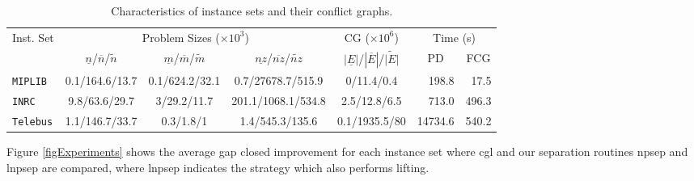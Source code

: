 \documentclass{endm}
\begin{document}
\begin{table}[h]
\scriptsize
\caption{Characteristics of instance sets and their conflict graphs.}\label{tab:inst}
\begin{center}
\begin{tabular}{|l|c|c|c|c|r|r|}
\hline 
\multirow{2}{0.8cm}{Inst. Set} & \multicolumn{3}{c|}{{Problem Sizes ($\times10^{3}$)}} & {CG ($\times10^{6}$)} & \multicolumn{2}{c|}{{Time (s)}}\tabularnewline
\cline{2-7} 
 & {$\underline{n}$/$\overline{n}$/$\tilde{n}$} & {$\underline{m}$/$\overline{m}$/$\tilde{m}$} & {$\underline{nz}$/$\overline{nz}$/$\tilde{nz}$} & {$|\underline{E}|$/$|\overline{E}|$/$\tilde{|E|}$} & \multicolumn{1}{c|}{PD} & \multicolumn{1}{c|}{FCG}\tabularnewline
\hline 
\hline 
\texttt{MIPLIB} & {0.1/164.6/13.7} & {0.1/624.2/32.1} & {0.7/27678.7/515.9} & {0/11.4/0.4} & {198.8} & {17.5}\tabularnewline
\hline 
\texttt{INRC} & {9.8/63.6/29.7} & {3/29.2/11.7} & {201.1/1068.1/534.8} & {2.5/12.8/6.5} & {713.0} & {496.3}\tabularnewline
\hline 
\texttt{Telebus} & {1.1/146.7/33.7} & {0.3/1.8/1} & {1.4/545.3/135.6} & {0.1/1935.5/80} & {14734.6} & {540.2}\tabularnewline
\hline 
\end{tabular}
\end{center}
\end{table}

Figure \ref{figExperiments} shows the average gap closed improvement for each instance set where cgl and our separation routines npsep and lnpsep are compared, where lnpsep indicates the strategy which also performs lifting.
\end{document}
